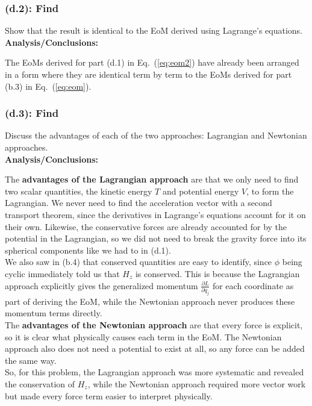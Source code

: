 \documentclass[titlepage]{article}
\begin{document}
\subsubsection*{(d.2): Find}

Show that the result is identical to the EoM derived using Lagrange's equations.\\

\textbf{Analysis/Conclusions:}\\

\begin{mdframed}[linewidth=1pt, innertopmargin=10pt, innerbottommargin=10pt]
	The EoMs derived for part (d.1) in Eq.~(\ref{eq:eom2}) have already been arranged in a form where they are identical term by term to the EoMs derived for part (b.3) in Eq.~(\ref{eq:eom}).
\end{mdframed}

\subsubsection*{(d.3): Find}

Discuss the advantages of each of the two approaches: Lagrangian and Newtonian approaches.\\

\textbf{Analysis/Conclusions:}\\

\begin{mdframed}[linewidth=1pt, innertopmargin=10pt, innerbottommargin=10pt]
	The \textbf{advantages of the Lagrangian approach} are that we only need to find two scalar quantities, the kinetic energy $T$ and potential energy $V$, to form the Lagrangian. We never need to find the acceleration vector with a second transport theorem, since the derivatives in Lagrange's equations account for it on their own. Likewise, the conservative forces are already accounted for by the potential in the Lagrangian, so we did not need to break the gravity force into its spherical components like we had to in (d.1).\\
	
	We also saw in (b.4) that conserved quantities are easy to identify, since $\phi$ being cyclic immediately told us that $H_z$ is conserved. This is because the Lagrangian approach explicitly gives the generalized momentum $\frac{\partial L}{\partial\dot{q}_j}$ for each coordinate as part of deriving the EoM, while the Newtonian approach never produces these momentum terms directly. \\
	
	The \textbf{advantages of the Newtonian approach} are that every force is explicit, so it is clear what physically causes each term in the EoM. The Newtonian approach also does not need a potential to exist at all, so any force can be added the same way.\\
	
	So, for this problem, the Lagrangian approach was more systematic and revealed the conservation of $H_z$, while the Newtonian approach required more vector work but made every force term easier to interpret physically.
\end{mdframed}
\end{document}
